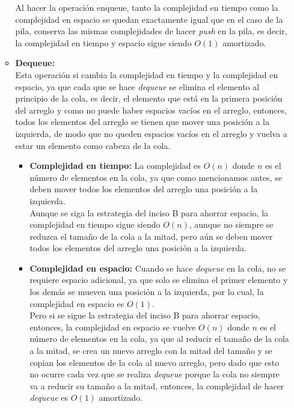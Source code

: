 \documentclass[12pt]{article}
\begin{document}
\begin{itemize}
\begin{itemize}
        Al hacer la operación enqueue, tanto la complejidad en tiempo como la complejidad en espacio se quedan exactamente igual que en el caso de la pila, conserva las mismas complejidades de hacer \textit{push} en la pila, es decir, la complejidad en tiempo y espacio sigue siendo $O(1)$ amortizado.
        \item \textbf{Dequeue:}\\
        Esta operación si cambia la complejidad en tiempo y la complejidad en espacio, ya que cada que se hace \textit{dequeue} se elimina el elemento al principio de la cola, es decir, el elemento que está en la primera posición del arreglo y como no puede haber espacios vacíos en el arreglo, entonces, todos los elementos del arreglo se tienen que mover una posición a la izquierda, de modo que no queden espacios vacíos en el arreglo y vuelva a estar un elemento como cabeza de la cola.
        \begin{itemize}
            \item \textbf{Complejidad en tiempo:} La complejidad es $O(n)$ donde $n$ es el número de elementos en la cola, ya que como mencionamos antes, se deben mover todos los elementos del arreglo una posición a la izquierda.\\
            Aunque se siga la estrategia del inciso B para ahorrar espacio, la complejidad en tiempo sigue siendo $O(n)$, aunque no siempre se reduzca el tamaño de la cola a la mitad, pero aún se deben mover todos los elementos del arreglo una posición a la izquierda.
            \item \textbf{Complejidad en espacio:} Cuando se hace \textit{dequeue} en la cola, no se requiere espacio adicional, ya que solo se elimina el primer elemento y los demás se mueven una posición a la izquierda, por lo cual, la complejidad en espacio es $O(1)$.\\
            Pero si se sigue la estrategia del inciso B para ahorrar espacio, entonces, la complejidad en espacio se vuelve $O(n)$ donde $n$ es el número de elementos en la cola, ya que al reducir el tamaño de la cola a la mitad, se crea un nuevo arreglo con la mitad del tamaño y se copian los elementos de la cola al nuevo arreglo, pero dado que esto no ocurre cada vez que se realiza \textit{dequeue} porque la cola no siempre va a reducir su tamaño a la mitad, entonces, la complejidad de hacer \textit{dequeue} es $O(1)$ amortizado.
        \end{itemize}
    \end{itemize}
\end{itemize}
\end{document}
